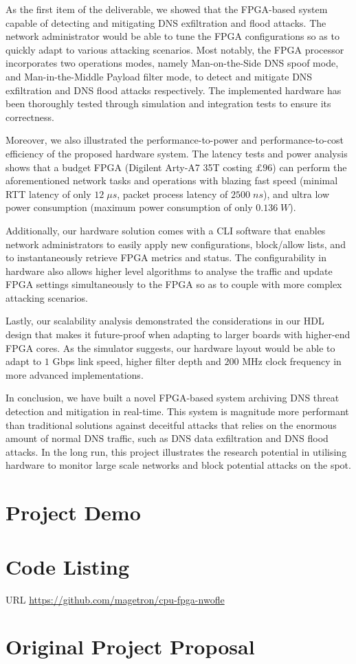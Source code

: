 \documentclass[a4paper]{report}
\begin{document}
As the first item of the deliverable, we showed that the FPGA-based system capable of detecting and mitigating DNS exfiltration and flood attacks. The network administrator would be able to tune the FPGA configurations so as to quickly adapt to various attacking scenarios. Most notably, the FPGA processor incorporates two operations modes, namely Man-on-the-Side DNS spoof mode, and Man-in-the-Middle Payload filter mode, to detect and mitigate DNS exfiltration and DNS flood attacks respectively. The implemented hardware has been thoroughly tested through simulation and integration tests to ensure its correctness.

Moreover, we also illustrated the performance-to-power and performance-to-cost efficiency of the proposed hardware system. The latency tests and power analysis shows that a budget FPGA (Digilent Arty-A7 35T costing $£96$) can perform the aforementioned network tasks and operations with blazing fast speed (minimal RTT latency of only $12\; \mu s$, packet process latency of $2500\; ns$), and ultra low power consumption (maximum power consumption of only $0.136\; W$). 

Additionally, our hardware solution comes with a CLI software that enables network administrators to easily apply new configurations, block/allow lists, and to instantaneously retrieve FPGA metrics and status. The configurability in hardware also allows higher level algorithms to analyse the traffic and update FPGA settings simultaneously to the FPGA so as to couple with more complex attacking scenarios.

Lastly, our scalability analysis demonstrated the considerations in our HDL design that makes it future-proof when adapting to larger boards with higher-end FPGA cores. As the simulator suggests, our hardware layout would be able to adapt to $1$ Gbps link speed, higher filter depth and $200$ MHz clock frequency in more advanced implementations.

In conclusion, we have built a novel FPGA-based system archiving DNS threat detection and mitigation in real-time. This system is magnitude more performant than traditional solutions against deceitful attacks that relies on the enormous amount of normal DNS traffic, such as DNS data exfiltration and DNS flood attacks. In the long run, this project illustrates the research potential in utilising hardware to monitor large scale networks and block potential attacks on the spot.

\printbibliography[title=References]

\appendix

\chapter{Project Demo}

\chapter{Code Listing}

URL \url{https://github.com/magetron/cpu-fpga-nwofle}

\chapter{Original Project Proposal}
\end{document}
